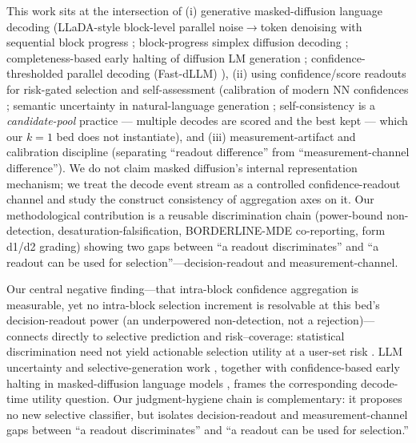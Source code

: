 \documentclass{article}
\begin{document}
This work sits at the intersection of (i) generative masked-diffusion language decoding
(LLaDA-style block-level parallel noise$\rightarrow$token denoising with
sequential block progress \cite{llda}; block-progress simplex diffusion decoding \cite{ssdlm};
completeness-based early halting of diffusion LM generation \cite{halting};
confidence-thresholded parallel decoding (Fast-dLLM) \cite{wu2025fastdllm}), (ii) using
confidence/score readouts for risk-gated selection and self-assessment (calibration of modern NN confidences
\cite{guo2017calibration}; semantic uncertainty in natural-language generation \cite{kuhn2023semantic};
self-consistency \cite{wang2023selfconsistency} is a \emph{candidate-pool} practice --- multiple
decodes are scored and the best kept --- which our $k{=}1$ bed does not instantiate),
and (iii) measurement-artifact and calibration discipline
(separating ``readout difference'' from ``measurement-channel difference''). We do not claim masked
diffusion's internal representation mechanism; we treat the decode event stream as a
controlled confidence-readout channel and study the construct consistency of aggregation
axes on it. Our methodological contribution is a reusable discrimination chain
(power-bound non-detection, desaturation-falsification, BORDERLINE-MDE co-reporting, form
d1/d2 grading) showing two gaps between ``a readout discriminates'' and ``a readout can be
used for selection''---decision-readout and measurement-channel.

Our central negative finding---that intra-block confidence aggregation is measurable, yet
no intra-block selection increment is resolvable at this bed's decision-readout power (an
underpowered non-detection, not a rejection)---connects directly to selective prediction and
risk--coverage: statistical discrimination need not yield actionable selection utility at
a user-set risk \citep{chow1970character,bartlett2008classification,
elyaniv2010foundations,geifman2017selective}. LLM uncertainty and selective-generation work
\citep{kuhn2023semantic,lin2022teaching}, together with confidence-based early halting in
masked-diffusion language models \citep{halting}, frames the corresponding decode-time
utility question. Our judgment-hygiene chain is complementary: it proposes no new selective
classifier, but isolates decision-readout and measurement-channel gaps between ``a readout
discriminates'' and ``a readout can be used for selection.''
\end{document}
